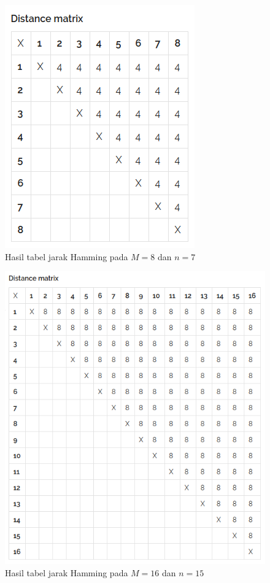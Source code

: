 \begin{figure}
\centering
\includegraphics[scale=0.5]{../img/perfect8.png}
\caption{Hasil tabel jarak Hamming pada $M=8$ dan $n=7$}
\label{fig:perfect8}
\end{figure}

\begin{figure}
\centering
\includegraphics[scale=0.45]{../img/perfect16.png}
\caption{Hasil tabel jarak Hamming pada $M=16$ dan $n=15$}
\label{fig:perfect16}
\end{figure}

